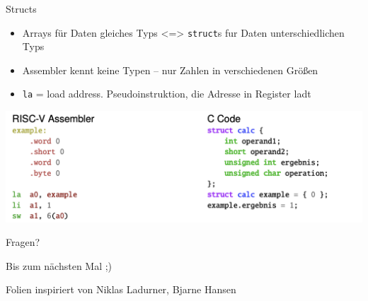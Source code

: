 \documentclass[
  german,            %
  aspectratio=169,    %
]{tumbeamer}
\begin{document}
\begin{frame}[c]{Structs}{}
  \begin{itemize}
    \item Arrays für Daten gleiches Typs <=> \texttt{struct}s fur Daten unterschiedlichen Typs 
    \item Assembler kennt keine Typen -- nur Zahlen in verschiedenen Größen
    \item \texttt{la} = load address. Pseudoinstruktion, die Adresse in Register ladt
  \end{itemize}
  \vspace{0.4cm}
  \includegraphics[width=\linewidth]{strutcs_comparison.png}
\end{frame} 



\begin{frame}[c]{}{}
  \begin{center}
    \LARGE Fragen?
  \end{center}
  \vspace{0.5cm}
  \begin{center}
    \LARGE Bis zum nächsten Mal ;) \\
  \end{center}
  \vspace{1.0cm}
  \begin{center}
    \small Folien inspiriert von Niklas Ladurner, Bjarne Hansen
  \end{center}
\end{frame}
\end{document}
